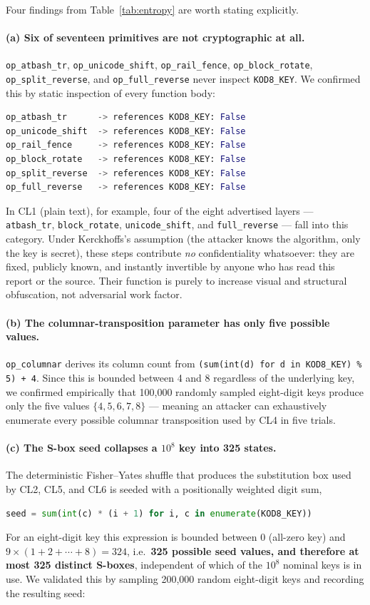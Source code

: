 \documentclass[11pt]{article}
\begin{document}
Four findings from Table~\ref{tab:entropy} are worth stating explicitly.

\paragraph{(a) Six of seventeen primitives are not cryptographic at all.}
\texttt{op\_atbash\_tr}, \texttt{op\_unicode\_shift},
\texttt{op\_rail\_fence}, \texttt{op\_block\_rotate},
\texttt{op\_split\_reverse}, and \texttt{op\_full\_reverse} never inspect
\texttt{KOD8\_KEY}. We confirmed this by static inspection of every
function body:

\begin{lstlisting}[language=Python]
op_atbash_tr      -> references KOD8_KEY: False
op_unicode_shift  -> references KOD8_KEY: False
op_rail_fence     -> references KOD8_KEY: False
op_block_rotate   -> references KOD8_KEY: False
op_split_reverse  -> references KOD8_KEY: False
op_full_reverse   -> references KOD8_KEY: False
\end{lstlisting}

In CL1 (plain text), for example, four of the eight advertised layers ---
\texttt{atbash\_tr}, \texttt{block\_rotate}, \texttt{unicode\_shift}, and
\texttt{full\_reverse} --- fall into this category. Under Kerckhoffs's
assumption (the attacker knows the algorithm, only the key is secret),
these steps contribute \emph{no} confidentiality whatsoever: they are
fixed, publicly known, and instantly invertible by anyone who has read
this report or the source. Their function is purely to increase visual
and structural obfuscation, not adversarial work factor.

\paragraph{(b) The columnar-transposition parameter has only five possible values.}
\texttt{op\_columnar} derives its column count from
\texttt{(sum(int(d) for d in KOD8\_KEY) \% 5) + 4}. Since this is bounded
between 4 and 8 regardless of the underlying key, we confirmed empirically
that 100{,}000 randomly sampled eight-digit keys produce only the five
values $\{4,5,6,7,8\}$ --- meaning an attacker can exhaustively enumerate
every possible columnar transposition used by CL4 in five trials.

\paragraph{(c) The S-box seed collapses a $10^{8}$ key into 325 states.}
The deterministic Fisher–Yates shuffle that produces the substitution
box used by CL2, CL5, and CL6 is seeded with a positionally weighted
digit sum,
\begin{lstlisting}[language=Python]
seed = sum(int(c) * (i + 1) for i, c in enumerate(KOD8_KEY))
\end{lstlisting}
For an eight-digit key this expression is bounded between 0 (all-zero
key) and $9\times(1+2+\cdots+8)=324$, i.e.\ \textbf{325 possible seed
values, and therefore at most 325 distinct S-boxes}, independent of
which of the $10^{8}$ nominal keys is in use. We validated this by
sampling 200{,}000 random eight-digit keys and recording the resulting
seed:
\end{document}
